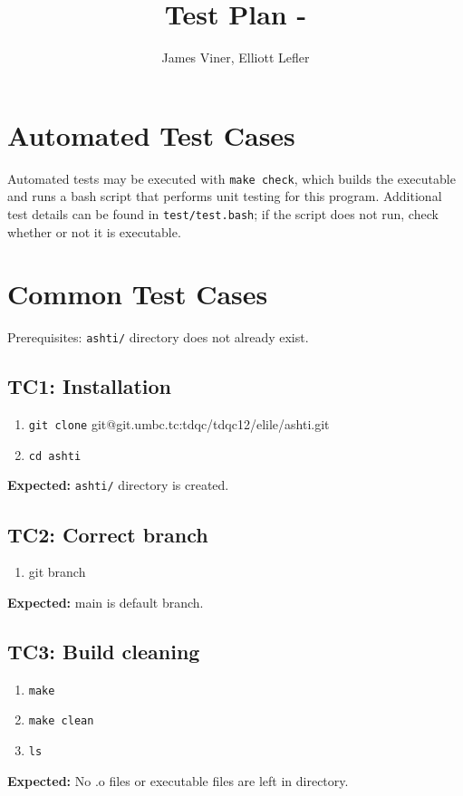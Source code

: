 \documentclass[11pt]{report}
\title{Test Plan - \docname}
\author{James Viner, Elliott Lefler}
\date{} %
\def\dirname{ashti}
\begin{document}
\maketitle

\doublespacing

\pagebreak
\section*{Automated Test Cases}
Automated tests may be executed with {\texttt{\color{MidnightBlue}make check}}, which builds the executable and runs a bash script that performs unit testing for this program. Additional test details can be found in {\texttt{\color{MidnightBlue}test/test.bash}}; if the script does not run, check whether or not it is executable.
\pagebreak
\section*{Common Test Cases}
Prerequisites: {\texttt{\color{MidnightBlue}\dirname/}} directory does not already exist.
\subsection*{TC1: Installation}
\begin{enumerate}
  \item {\texttt{\color{MidnightBlue}git clone} {\color{MidnightBlue}git@git.umbc.tc}}{\color{MidnightBlue}:tdqc/tdqc12/elile/\dirname.git}
  \item {\texttt{\color{MidnightBlue}cd \dirname}}
\end{enumerate}
\textbf{Expected:} {\texttt{\color{MidnightBlue}\dirname/}} directory is created.
\subsection*{TC2: Correct branch}
\begin{enumerate}
  \item {\color{MidnightBlue}git branch}
\end{enumerate}
\textbf{Expected:} {\color{MidnightBlue}main} is default branch.
\subsection*{TC3: Build cleaning}
\begin{enumerate}
  \item {\texttt{\color{MidnightBlue}make}}
  \item {\texttt{\color{MidnightBlue}make clean}}
  \item {\texttt{\color{MidnightBlue}ls}}
\end{enumerate}
\textbf{Expected:} No .o files or executable files are left in directory.
\pagebreak
\end{document}
